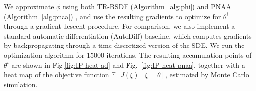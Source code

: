 \documentclass[letterpaper, 10 pt, conference]{ieeeconf}  %
\def\Expect{{\mathbb E}}
\begin{document}
We approximate $\phi$ using both TR-BSDE (Algorithm~\ref{alg:phi}) and PNAA (Algorithm~\ref{alg:pnaa}) , and use the resulting gradients to optimize  for $\theta^i$ through a gradient descent procedure. For comparison, we also implement a standard automatic differentiation (AutoDiff) baseline, which computes gradients by backpropagating through a time-discretized version of the SDE. We run the optimization algorithm for $15000$ iterations. 
The resulting accumulation points of $\theta^i$ are shown in Fig \ref{fig:IP-heat-ad} and Fig.~\ref{fig:IP-heat-pnaa}, together with a heat map of the objective function $\Expect[J(\xi)\mid \xi=\theta]$, estimated by Monte Carlo simulation.
\end{document}
